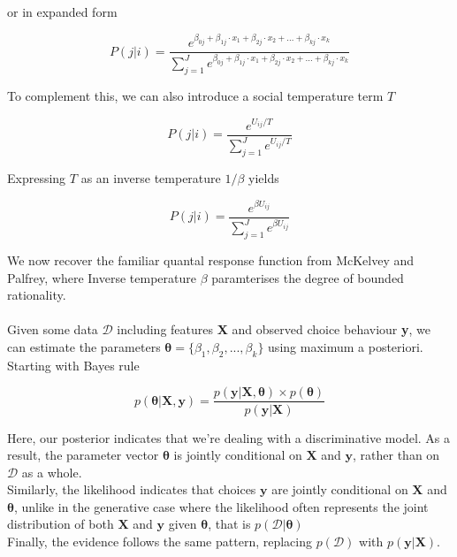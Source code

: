 \documentclass{article}
\begin{document}
or in expanded form

\[
P(j|i) = \frac{e^{\beta_{0j} + \beta_{1j} \cdot x_1 + \beta_{2j} \cdot x_2 + \ldots + \beta_{kj} \cdot x_k}}{\sum_{j=1}^{J} e^{\beta_{0j} + \beta_{1j} \cdot x_1 + \beta_{2j} \cdot x_2 + \ldots + \beta_{kj} \cdot x_k}}
\]



To complement this, we can also introduce a social temperature term $T$

\[
P(j|i) = \frac{e^{U_{ij}/T}}{\sum_{j=1}^{J} e^{U_{ij}/T}}
\]

Expressing $T$ as an inverse temperature $1/\beta$ yields

\[
P(j|i) = \frac{e^{\beta U_{ij}}}{\sum_{j=1}^{J} e^{\beta U_{ij}}}
\]

We now recover the familiar quantal response function from McKelvey and Palfrey, where Inverse temperature $\beta$ paramterises the degree of bounded rationality. \\ \\

Given some data $\mathcal{D}$ including features \textbf{X} and observed choice behaviour \textbf{y}, we can estimate the parameters $\boldsymbol{\theta} = \{\beta_1, \beta_2, ..., \beta_k\}$ using maximum a posteriori. \\

Starting with Bayes rule

\[
p(\boldsymbol{\theta} | \textbf{X}, \textbf{y}) = \frac{p(\textbf{y} | \textbf{X}, \boldsymbol{\theta}
) \times p(\boldsymbol{\theta})}{p(\textbf{y} | \textbf{X})}
\]

Here, our posterior indicates that we're dealing with a discriminative model. As a result, the parameter vector $\boldsymbol{\theta}$ is jointly conditional on $\textbf{X}$ and $\textbf{y}$, rather than on $\mathcal{D}$ as a whole. \\

Similarly, the likelihood indicates that choices \( \textbf{y} \) are jointly conditional on \( \textbf{X} \) and \( \boldsymbol{\theta}\), unlike in the generative case where the likelihood often represents the joint distribution of both \( \textbf{X} \) and \( \textbf{y} \) given \( \boldsymbol{\theta} \), that is \( p( \mathcal{D}| \boldsymbol{\theta}) \) \\

Finally, the evidence follows the same pattern, replacing \( p(\mathcal{D}) \) with \( p(\textbf{y} | \textbf{X}) \). \\
\end{document}
